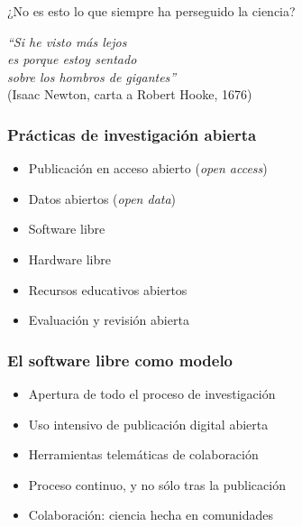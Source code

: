 \documentclass[17pt,aspectratio=169]{beamer}
\begin{document}
\begin{frame}

  \begin{center}
    {\Large ¿No es esto lo que siempre ha perseguido la ciencia?\\}
  \end{center}

  \vspace{1cm}
  
  \begin{flushright}
    {\em ``Si he visto más lejos\\
    es porque estoy sentado\\
    sobre los hombros de gigantes''\\}
  \vspace{.3cm}
    {\small (Isaac Newton, carta a Robert Hooke, 1676)\\}
  \end{flushright}
\end{frame}


\begin{frame}
\frametitle{Prácticas de investigación abierta}

\begin{itemize}
\item Publicación en acceso abierto (\emph{open access})
\item Datos abiertos (\emph{open data})
\item Software libre
\item Hardware libre
\item Recursos educativos abiertos
\item Evaluación y revisión abierta
\end{itemize}

\end{frame}


\begin{frame}
\frametitle{El software libre como modelo}

\begin{itemize}
\item Apertura de todo el proceso de investigación
\item Uso intensivo de publicación digital abierta
\item Herramientas telemáticas de colaboración
\item Proceso continuo, y no sólo tras la publicación
\item Colaboración: ciencia hecha en comunidades
\end{itemize}

\end{frame}
\end{document}
